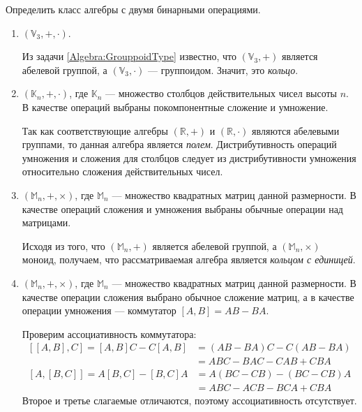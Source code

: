 \begin{task}
    Определить класс алгебры с двумя бинарными операциями.
    \begin{enumerate}
        \item $(\mathbb{V}_3, +, \cdot)$.\\
        \begin{solution}
            Из задачи \ref{Algebra:GrouppoidType} известно, что $(\mathbb{V}_3, +)$ является абелевой группой, а $(\mathbb{V}_3, \cdot)$ --- группоидом. Значит, это \textit{кольцо}.
        \end{solution}
        \item $(\mathbb{K}_n, +, \cdot)$, где $\mathbb{K}_n$ --- множество столбцов действительных чисел высоты $n$. В качестве операций выбраны покомпонентные сложение и умножение.\\
        \begin{solution}
            Так как соответствующие алгебры $(\mathbb{R}, +)$ и $(\mathbb{R}, \cdot)$ являются абелевыми группами, то данная алгебра является \textit{полем}. Дистрибутивность операций умножения и сложения для столбцов следует из дистрибутивности умножения относительно сложения действительных чисел.
        \end{solution}
        \item $(\mathbb{M}_n, +, \times)$, где $\mathbb{M}_n$ --- множество квадратных матриц данной размерности. В качестве операций сложения и умножения выбраны обычные операции над матрицами.\\
        \begin{solution}
            Исходя из того, что $(\mathbb{M}_n, +)$ является абелевой группой, а $(\mathbb{M}_n, \times)$ моноид, получаем, что рассматриваемая алгебра является \textit{кольцом с единицей}.
        \end{solution}
        \item $(\mathbb{M}_n, +, \times)$, где $\mathbb{M}_n$ --- множество квадратных матриц данной размерности. В качестве операции сложения выбрано обычное сложение матриц, а в качестве операции умножения --- коммутатор $[A, B] = AB − BA$.\\
        \begin{solution}
            Проверим ассоциативность коммутатора:
            \begin{equation*}
                \begin{aligned}
                    \left[\left[A, B\right], C\right]=[A,B]C-C[A,B] &=(AB-BA)C-C(AB-BA)\\ &=ABC-BAC-CAB+CBA
                \end{aligned}
            \end{equation*}
            \begin{equation*}
                \begin{aligned}
                    \left[A, \left[B, C\right]\right]=A[B,C]-[B,C]A &=A(BC-CB)-(BC-CB)A\\ &=ABC-ACB-BCA+CBA
                \end{aligned}
            \end{equation*}
            Второе и третье слагаемые отличаются, поэтому ассоциативность отсутствует.


\end{solution}
\end{enumerate}
\end{task}
